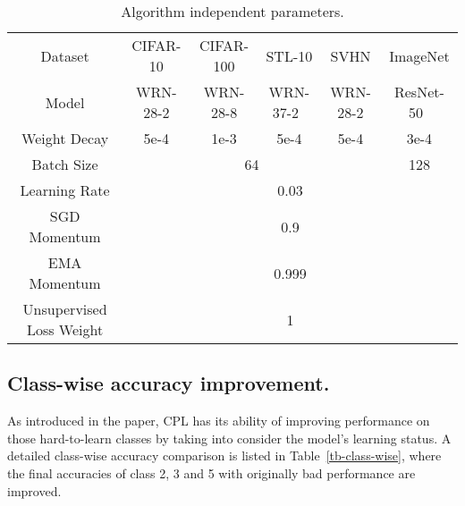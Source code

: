 \begin{table}[!htbp]
    \centering
    \caption{Algorithm independent parameters.}
    \label{tab-para-algo-inde}
    \begin{adjustbox}{width=0.8\columnwidth,center}
    \begin{tabular}{cccccc}\toprule
Dataset &  CIFAR-10 & CIFAR-100 & STL-10 & SVHN & ImageNet \\\cmidrule(r){1-1} \cmidrule(lr){2-2}\cmidrule(lr){3-3}\cmidrule(lr){4-4}\cmidrule(lr){5-5}\cmidrule(l){6-6}
Model    &  WRN-28-2 \citep{zagoruyko2016wide} & WRN-28-8 & WRN-37-2~\cite{zhou2020time} & WRN-28-2 & ResNet-50~\citep{he2016deep} \\\cmidrule(r){1-1} \cmidrule(lr){2-2}\cmidrule(lr){3-3}\cmidrule(lr){4-4}\cmidrule(lr){5-5}\cmidrule(l){6-6}
Weight Decay&  5e-4  & 1e-3 & 5e-4 & 5e-4 & 3e-4\\ \cmidrule(r){1-1} \cmidrule(lr){2-2}\cmidrule(lr){3-3}\cmidrule(lr){4-4}\cmidrule(lr){5-5}\cmidrule(l){6-6}
Batch Size & \multicolumn{4}{c}{64} & \multicolumn{1}{c}{128}\\\cmidrule(r){1-1} \cmidrule(lr){2-5} \cmidrule(l){6-6}
Learning Rate & \multicolumn{5}{c}{0.03}\\\cmidrule(r){1-1} \cmidrule(l){2-6}
SGD Momentum & \multicolumn{5}{c}{0.9}\\\cmidrule(r){1-1} \cmidrule(l){2-6}
EMA Momentum & \multicolumn{5}{c}{0.999}\\\cmidrule(r){1-1} \cmidrule(l){2-6}
Unsupervised Loss Weight & \multicolumn{5}{c}{1}\\
\bottomrule
    \end{tabular}
    \end{adjustbox}
    
\end{table}

\subsection{Class-wise accuracy improvement.} As introduced in the paper, CPL has its ability of improving performance on those hard-to-learn classes by taking into consider the model's learning status. A detailed class-wise accuracy comparison is listed in Table~\ref{tb-class-wise}, where the final accuracies of class 2, 3 and 5 with originally bad performance are improved. 

